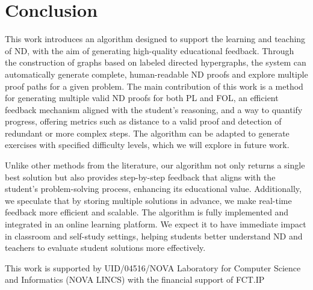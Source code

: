 \section{Conclusion}
This work introduces an algorithm designed to support the learning and teaching of ND, with the aim of generating high-quality educational feedback. Through the construction of graphs based on labeled directed hypergraphs, the system can automatically generate complete, human-readable ND proofs and explore multiple proof paths for a given problem.
The main contribution of this work is a method for generating multiple valid ND proofs for both PL and FOL, an efficient feedback mechanism aligned with the student’s reasoning, and a way to quantify progress, offering metrics such as distance to a valid proof and detection of redundant or more complex steps. The algorithm can be adapted to generate exercises with specified difficulty levels, which we will explore in future work.

Unlike other methods from the literature, our algorithm not only returns a single best solution but also provides step-by-step feedback that aligns with the student’s problem-solving process, enhancing its educational value. Additionally, we speculate that by storing multiple solutions in advance, we make real-time feedback more efficient and scalable.
%
The algorithm is fully implemented and integrated in an online learning platform. We expect it to have immediate impact in classroom and self-study settings, helping students better understand ND and teachers to evaluate student solutions more effectively.

This work is supported by UID/04516/NOVA Laboratory for Computer Science and Informatics (NOVA LINCS) with the financial support of FCT.IP